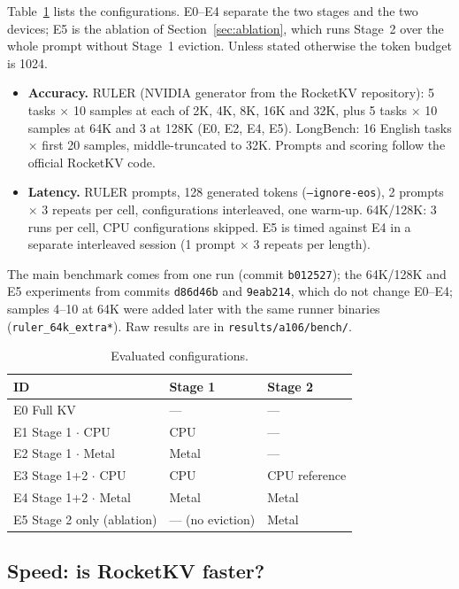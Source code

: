 \documentclass[10pt,letterpaper]{article}
\newcommand{\code}[1]{\texttt{#1}}
\begin{document}
Table~\ref{tab:configs} lists the configurations. E0--E4 separate the two stages and the two devices; E5 is the ablation of Section~\ref{sec:ablation}, which runs Stage~2 over the whole prompt without Stage~1 eviction. Unless stated otherwise the token budget is 1024.
\begin{itemize}
\item \textbf{Accuracy.} RULER (NVIDIA generator from the RocketKV repository): 5 tasks $\times$ 10 samples at each of 2K, 4K, 8K, 16K and 32K, plus 5 tasks $\times$ 10 samples at 64K and 3 at 128K (E0, E2, E4, E5). LongBench: 16 English tasks $\times$ first 20 samples, middle-truncated to 32K. Prompts and scoring follow the official RocketKV code.
\item \textbf{Latency.} RULER prompts, 128 generated tokens (\code{--ignore-eos}), 2 prompts $\times$ 3 repeats per cell, configurations interleaved, one warm-up. 64K/128K: 3 runs per cell, CPU configurations skipped. E5 is timed against E4 in a separate interleaved session (1 prompt $\times$ 3 repeats per length).
\end{itemize}
The main benchmark comes from one run (commit \code{b012527}); the 64K/128K and E5 experiments from commits \code{d86d46b} and \code{9eab214}, which do not change E0--E4; samples 4--10 at 64K were added later with the same runner binaries (\code{ruler\_64k\_extra*}). Raw results are in \code{results/a106/bench/}.

\begin{table}[h]
\centering\small
\caption{Evaluated configurations.}
\label{tab:configs}
\begin{tabular}{lll}
\toprule
ID & Stage 1 & Stage 2 \\
\midrule
E0 Full KV & --- & --- \\
E1 Stage 1 $\cdot$ CPU & CPU & --- \\
E2 Stage 1 $\cdot$ Metal & Metal & --- \\
E3 Stage 1+2 $\cdot$ CPU & CPU & CPU reference \\
E4 Stage 1+2 $\cdot$ Metal & Metal & Metal \\
E5 Stage 2 only (ablation) & --- (no eviction) & Metal \\
\bottomrule
\end{tabular}
\end{table}

\subsection{Speed: is RocketKV faster?}
\label{sec:speed}
\end{document}
